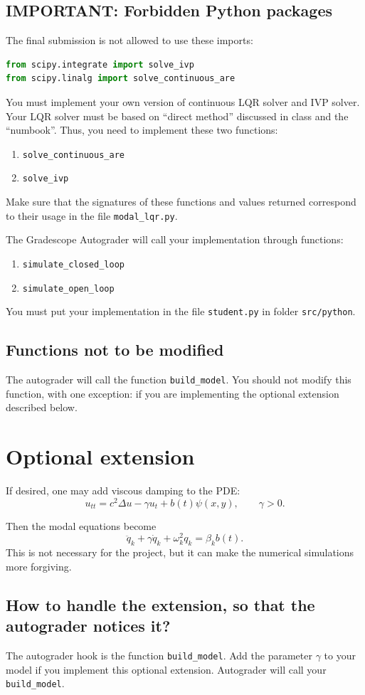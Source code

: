 \documentclass[11pt]{article}
\begin{document}
\subsection{IMPORTANT: Forbidden Python packages} 
The final submission is not allowed to use these imports:
\begin{lstlisting}[language=Python]
from scipy.integrate import solve_ivp
from scipy.linalg import solve_continuous_are
\end{lstlisting}

You must implement your own version of continuous LQR solver and
IVP solver. Your LQR solver must be based on ``direct method''
discussed in class and the ``numbook''. Thus, you need to implement these
two functions:

\begin{enumerate}
\item \texttt{solve\_continuous\_are}
\item \texttt{solve\_ivp}
\end{enumerate}

Make sure that the signatures of these functions and values returned
correspond to their usage in the file \texttt{modal\_lqr.py}.

The Gradescope Autograder will call your implementation
through functions:

\begin{enumerate}
  \item \texttt{simulate\_closed\_loop}
  \item \texttt{simulate\_open\_loop}
\end{enumerate}

You must put your implementation in the file
\texttt{student.py} in folder \texttt{src/python}.

\subsection{Functions not to be modified}
The autograder will call the function \texttt{build\_model}.
You should not modify this function, with one exception: if
you are implementing the optional extension described below.


\section*{Optional extension}
If desired, one may add viscous damping to the PDE:
\[u_{tt}=c^2\Delta u - \gamma u_t + b(t)\psi(x,y),\qquad \gamma>0.\]

Then the modal equations become
\[
\ddot q_k + \gamma \dot q_k + \omega_k^2 q_k = \beta_k b(t).
\]
This is not necessary for the project, but it can make the numerical 
simulations more forgiving.

\subsection{How to handle the extension, so that the autograder notices it?}
The autograder hook is the function \texttt{build\_model}. Add the
parameter \(\gamma\) to your model if you implement this optional extension.
Autograder will call your \texttt{build_model}.
\end{document}
